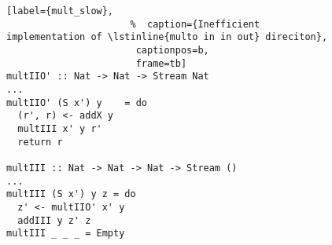 \begin{figure}[!t]
  \centering
  \begin{minipage}{\columnwidth}
    \begin{lstlisting}[label={mult_slow},
                      %  caption={Inefficient implementation of \lstinline{multo in in out} direciton},
                       captionpos=b,
                       frame=tb]
multIIO' :: Nat -> Nat -> Stream Nat
...
multIIO' (S x') y    = do
  (r', r) <- addX y
  multIII x' y r'
  return r

multIII :: Nat -> Nat -> Nat -> Stream ()
...
multIII (S x') y z = do
  z' <- multIIO' x' y
  addIII y z' z
multIII _ _ _ = Empty
    \end{lstlisting}
  \end{minipage}
\end{figure}
